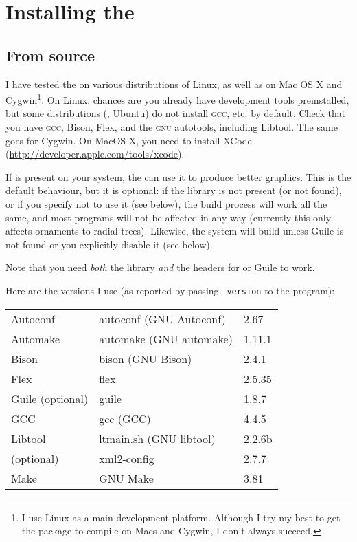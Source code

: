 \chapter{Installing the \nutils}
\label{app:installing}

\section{From source}

I have tested the \nutils{} on various distributions of Linux, as well as on
Mac OS X and Cygwin\footnote{I use Linux as a main development platform.
Although I try my best to get the package to compile on Macs and Cygwin, I don't
always succeed.}. On Linux, chances are you already have development tools
preinstalled, but some distributions (\eg, Ubuntu) do not install \textsc{gcc},
etc. by default. Check that you have \textsc{gcc}, Bison, Flex, and the
\textsc{gnu} autotools, including Libtool. The same goes for Cygwin. On MacOS X,
you need to install XCode (\url{http://developer.apple.com/tools/xcode}).

\noindent{}If \libxml{} is present on your system, the \nutils{} can use it to
produce better \svg{} graphics. This is the default behaviour, but it is
optional: if the library is not present (or not found), or if you specify not to
use it (see below), the build process will work all the same, and most programs
will not be affected in any way (currently this only affects ornaments to
radial \svg{} trees).  Likewise, the system will build \sched{} unless Guile is
not found or you explicitly disable it (see below).

Note that you need \emph{both} the library \emph{and} the headers for \libxml{}
or Guile to work.

\noindent{}Here are the versions I use (as reported by passing \texttt{--version} to the program):

\medskip
\begin{tabular}{lll}
Autoconf					& autoconf (GNU Autoconf) & 2.67 \\
Automake					& automake (GNU automake) & 1.11.1 \\
Bison  						& bison (GNU Bison) 			& 2.4.1 \\ 
Flex							& flex 										& 2.5.35 \\
Guile	(optional)	& guile										& 1.8.7 \\
GCC 							& gcc (GCC) 							& 4.4.5 \\
Libtool						& ltmain.sh (GNU libtool) & 2.2.6b \\
\libxml{} (optional)	& xml2-config							& 2.7.7 \\ 
Make							& GNU Make 								& 3.81
\end{tabular}
\medskip

